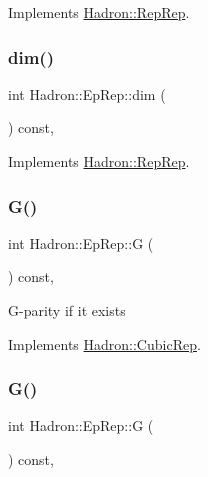 Implements \mbox{\hyperlink{structHadron_1_1RepRep_a92c8802e5ed7afd7da43ccfd5b7cd92b}{Hadron\+::\+Rep\+Rep}}.

\mbox{\label{structHadron_1_1EpRep_a1c0d8b8924b0bb66325c1049fc6cd76e}} 
\subsubsection{\texorpdfstring{dim()}{dim()}\hspace{0.1cm}{\footnotesize\ttfamily [3/3]}}
{\footnotesize\ttfamily int Hadron\+::\+Ep\+Rep\+::dim (\begin{DoxyParamCaption}{ }\end{DoxyParamCaption}) const\hspace{0.3cm}{\ttfamily [inline]}, {\ttfamily [virtual]}}



Implements \mbox{\hyperlink{structHadron_1_1RepRep_a92c8802e5ed7afd7da43ccfd5b7cd92b}{Hadron\+::\+Rep\+Rep}}.

\mbox{\label{structHadron_1_1EpRep_a83c706de18931ef00c9909e5ab053d68}} 
\subsubsection{\texorpdfstring{G()}{G()}\hspace{0.1cm}{\footnotesize\ttfamily [1/2]}}
{\footnotesize\ttfamily int Hadron\+::\+Ep\+Rep\+::G (\begin{DoxyParamCaption}{ }\end{DoxyParamCaption}) const\hspace{0.3cm}{\ttfamily [inline]}, {\ttfamily [virtual]}}

G-\/parity if it exists 

Implements \mbox{\hyperlink{structHadron_1_1CubicRep_a52104e43266d1614c00bbd1c3b395458}{Hadron\+::\+Cubic\+Rep}}.

\mbox{\label{structHadron_1_1EpRep_a83c706de18931ef00c9909e5ab053d68}} 
\subsubsection{\texorpdfstring{G()}{G()}\hspace{0.1cm}{\footnotesize\ttfamily [2/2]}}
{\footnotesize\ttfamily int Hadron\+::\+Ep\+Rep\+::G (\begin{DoxyParamCaption}{ }\end{DoxyParamCaption}) const\hspace{0.3cm}{\ttfamily [inline]}, {\ttfamily [virtual]}}

